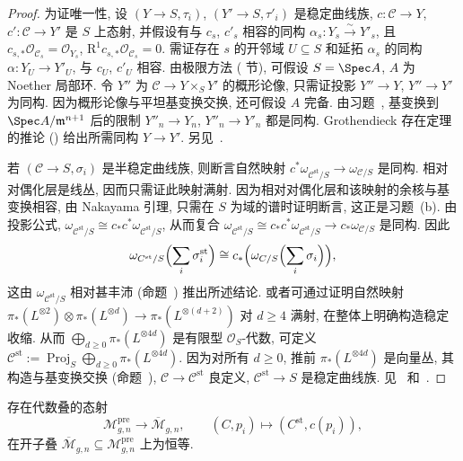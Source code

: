 \begin{proof}
为证唯一性, 设 $(Y\to\allowbreak S,\allowbreak \tau_i)$, $(Y'\to\allowbreak S,\allowbreak \tau'_i)$ 是稳定曲线族, $c:\mathcal C\to\allowbreak Y$, $c':\mathcal C\to\allowbreak Y'$ 是 $S$ 上态射, 并假设有与 $c_s$, $c'_s$ 相容的同构 $\alpha_s:Y_s\xrightarrow{\sim}Y'_s$, 且 $c_{s,\allowbreak *}\mathcal O_{\mathcal C_s}=\mathcal O_{Y_s}$, $\mathrm R^1c_{s,\allowbreak *}\mathcal O_{\mathcal C_s}=0$. 需证存在 $s$ 的开邻域 $U\subseteq S$ 和延拓 $\alpha_s$ 的同构 $\alpha:Y_U\to\allowbreak Y'_U$, 与 $c_U$, $c'_U$ 相容. 由极限方法 ( 节), 可假设 $S=\Spec A$, $A$ 为 Noether 局部环. 令 $Y''$ 为 $\mathcal C\to\allowbreak Y\times_S Y'$ 的概形论像, 只需证投影 $Y''\to\allowbreak Y$, $Y''\to\allowbreak Y'$ 为同构. 因为概形论像与平坦基变换交换, 还可假设 $A$ 完备. 由习题~, 基变换到 $\Spec A/\mathfrak m^{n+1}$ 后的限制 $Y''_n\to\allowbreak Y_n$, $Y''_n\to\allowbreak Y'_n$ 都是同构. Grothendieck 存在定理的推论 () 给出所需同构 $Y\to\allowbreak Y'$. 另见~\cite[Tag 0E8A]{SP}.

若 $(\mathcal C\to\allowbreak S,\allowbreak \sigma_i)$ 是半稳定曲线族, 则断言自然映射 $c^*\omega_{\mathcal C^{\mathrm{st}}/S}\to\omega_{\mathcal C/S}$ 是同构. 相对对偶化层是线丛, 因而只需证此映射满射. 因为相对对偶化层和该映射的余核与基变换相容, 由 Nakayama 引理, 只需在 $S$ 为域的谱时证明断言, 这正是习题~(b). 由投影公式, $\omega_{\mathcal C^{\mathrm{st}}/S}\cong c_*c^*\omega_{\mathcal C^{\mathrm{st}}/S}$, 从而复合 $\omega_{\mathcal C^{\mathrm{st}}/S}\cong c_*c^*\omega_{\mathcal C^{\mathrm{st}}/S}\to\allowbreak c_*\omega_{\mathcal C/S}$ 是同构. 因此
\[
\omega_{\mathcal C^{\mathrm{st}}/S}\Bigl(\sum_i\sigma_i^{\mathrm{st}}\Bigr)
\cong c_*\Bigl(\omega_{\mathcal C/S}\Bigl(\sum_i\sigma_i\Bigr)\Bigr),
\]
这由 $\omega_{\mathcal C^{\mathrm{st}}/S}$ 相对甚丰沛 (命题~) 推出所述结论. 或者可通过证明自然映射 $\pi_*(L^{\otimes2})\otimes\pi_*(L^{\otimes d})\to\pi_*(L^{\otimes(d+2)})$ 对 $d\geq4$ 满射, 在整体上明确构造稳定收缩. 从而 $\bigoplus_{d\geq0}\pi_*(L^{\otimes4d})$ 是有限型 $\mathcal O_S$-代数, 可定义 $\mathcal C^{\mathrm{st}}:=\operatorname{Proj}_S\bigoplus_{d\geq0}\pi_*(L^{\otimes4d})$. 因为对所有 $d\geq0$, 推前 $\pi_*(L^{\otimes4d})$ 是向量丛, 其构造与基变换交换 (命题~), $\mathcal C\to\mathcal C^{\mathrm{st}}$ 良定义, $\mathcal C^{\mathrm{st}}\to\allowbreak S$ 是稳定曲线族. 见~\cite[命题 2.1]{Knu83a} 和~\cite[命题 10.6.7]{ACG11}.
\end{proof}
\begin{corollary}[稳定收缩态射]\label{src:6.6.7}
存在代数叠的态射
\[
\mathcal M_{g,n}^{\mathrm{pre}}\to\overline{\mathcal M}_{g,n},\qquad
(C,p_i)\mapsto(C^{\mathrm{st}},c(p_i)),
\]
在开子叠 $\overline{\mathcal M}_{g,\allowbreak n}\subseteq\mathcal M_{g,\allowbreak n}^{\mathrm{pre}}$ 上为恒等.
\end{corollary}
